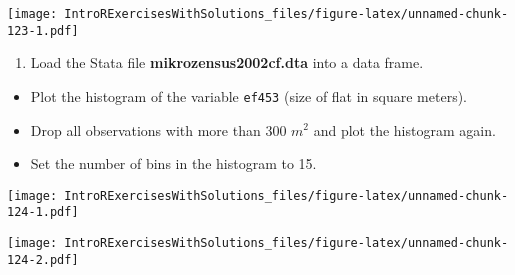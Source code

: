 \documentclass[]{article}
\newenvironment{Shaded}{\begin{snugshade}}{\end{snugshade}}
\newcommand{\KeywordTok}[1]{\textcolor[rgb]{0.13,0.29,0.53}{\textbf{#1}}}
\newcommand{\DataTypeTok}[1]{\textcolor[rgb]{0.13,0.29,0.53}{#1}}
\newcommand{\DecValTok}[1]{\textcolor[rgb]{0.00,0.00,0.81}{#1}}
\newcommand{\StringTok}[1]{\textcolor[rgb]{0.31,0.60,0.02}{#1}}
\newcommand{\CommentTok}[1]{\textcolor[rgb]{0.56,0.35,0.01}{\textit{#1}}}
\newcommand{\OperatorTok}[1]{\textcolor[rgb]{0.81,0.36,0.00}{\textbf{#1}}}
\newcommand{\NormalTok}[1]{#1}
\providecommand{\tightlist}{%
  \setlength{\itemsep}{0pt}\setlength{\parskip}{0pt}}
\begin{document}
\texttt{[image: IntroRExercisesWithSolutions\_files/figure-latex/unnamed-chunk-123-1.pdf]}

\begin{enumerate}
\def\labelenumi{\arabic{enumi}.}
\setcounter{enumi}{3}
\tightlist
\item
  Load the Stata file \textbf{mikrozensus2002cf.dta} into a data frame.
\end{enumerate}

\begin{itemize}
\item
  Plot the histogram of the variable \texttt{ef453} (size of flat in
  square meters).
\item
  Drop all observations with more than \(300\) \(m^{2}\) and plot the
  histogram again.
\item
  Set the number of bins in the histogram to 15.
\end{itemize}

\begin{Shaded}
\end{Shaded}

\texttt{[image: IntroRExercisesWithSolutions\_files/figure-latex/unnamed-chunk-124-1.pdf]}

\begin{Shaded}
\end{Shaded}

\texttt{[image: IntroRExercisesWithSolutions\_files/figure-latex/unnamed-chunk-124-2.pdf]}

\begin{Shaded}
\end{Shaded}
\end{document}
